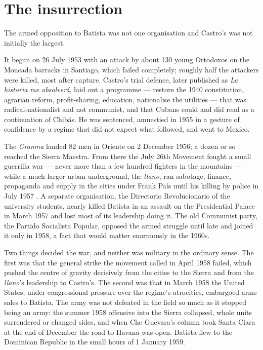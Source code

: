\section{The insurrection}

The armed opposition to Batista was not one organisation and Castro's was not
initially the largest.

It began on 26 July 1953 with an attack by about 130 young Ortodoxos on the
Moncada barracks in Santiago, which failed completely; roughly half the
attackers were killed, most after capture. Castro's trial defence, later
published as \emph{La historia me absolver\'a}, laid out a programme --- restore
the 1940 constitution, agrarian reform, profit-sharing, education, nationalise
the utilities --- that was radical-nationalist and not communist, and that
Cubans could and did read as a continuation of Chib\'as. He was sentenced,
amnestied in 1955 in a gesture of confidence by a regime that did not expect
what followed, and went to Mexico.

The \emph{Granma} landed 82 men in Oriente on 2 December 1956; a dozen or so
reached the Sierra Maestra. From there the July 26th Movement fought a small
guerrilla war --- never more than a few hundred fighters in the mountains ---
while a much larger urban underground, the \emph{llano}, ran sabotage, finance,
propaganda and supply in the cities under Frank Pa\'is until his killing by
police in July 1957 \citep{sweig2002}. A separate organisation, the Directorio Revolucionario of
the university students, nearly killed Batista in an assault on the
Presidential Palace in March 1957 and lost most of its leadership doing it. The
old Communist party, the Partido Socialista Popular, opposed the armed struggle
until late and joined it only in 1958, a fact that would matter enormously in
the 1960s.

Two things decided the war, and neither was military in the ordinary sense.
The first was that the general strike the movement called in April 1958 failed,
which pushed the centre of gravity decisively from the cities to the Sierra and
from the \emph{llano}'s leadership to Castro's. The second was that in March
1958 the United States, under congressional pressure over the regime's
atrocities, embargoed arms sales to Batista. The army was not defeated in the
field so much as it stopped being an army: the summer 1958 offensive into the
Sierra collapsed, whole units surrendered or changed sides, and when Che
Guevara's column took Santa Clara at the end of December the road to Havana was
open. Batista flew to the Dominican Republic in the small hours of 1 January
1959.

